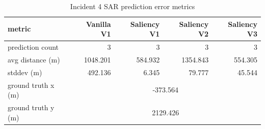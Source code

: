 \begin{table}[ht]
\centering
\caption{Incident 4 SAR prediction error metrics}
\label{tab:sar-incident-4}
\begin{tabular}{lrrrr}
\hline
metric & Vanilla V1 & Saliency V1 & Saliency V2 & Saliency V3 \\
\hline
prediction count & 3 & 3 & 3 & 3 \\
avg distance (m) & 1048.201 & 584.932 & 1354.843 & 554.305 \\
stddev (m) & 492.136 & 6.345 & 79.777 & 45.544 \\
ground truth x (m) & \multicolumn{4}{c}{-373.564} \\
ground truth y (m) & \multicolumn{4}{c}{2129.426} \\
\hline
\end{tabular}
\end{table}

